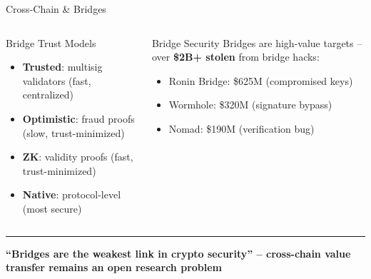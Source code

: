 \documentclass[8pt,aspectratio=169]{beamer}
\newcommand{\bottomnote}[1]{\vfill\vspace{-2mm}\textcolor{mllavender2}{\rule{\textwidth}{0.4pt}}\vspace{1mm}\footnotesize\textbf{#1}}
\begin{document}
\begin{frame}{Cross-Chain \& Bridges}
\begin{center}
\end{center}
\vspace{2mm}
\begin{columns}
\begin{block}{Bridge Trust Models}
\begin{itemize}\small
  \item \textbf{Trusted}: multisig validators (fast, centralized)
  \item \textbf{Optimistic}: fraud proofs (slow, trust-minimized)
  \item \textbf{ZK}: validity proofs (fast, trust-minimized)
  \item \textbf{Native}: protocol-level (most secure)
\end{itemize}
\end{block}
\begin{alertblock}{Bridge Security}
\small Bridges are high-value targets -- over \textbf{\$2B+ stolen} from bridge hacks:
\begin{itemize}\small
  \item Ronin Bridge: \$625M (compromised keys)
  \item Wormhole: \$320M (signature bypass)
  \item Nomad: \$190M (verification bug)
\end{itemize}
\end{alertblock}
\end{columns}
\bottomnote{``Bridges are the weakest link in crypto security'' -- cross-chain value transfer remains an open research problem}
\end{frame}
\end{document}
